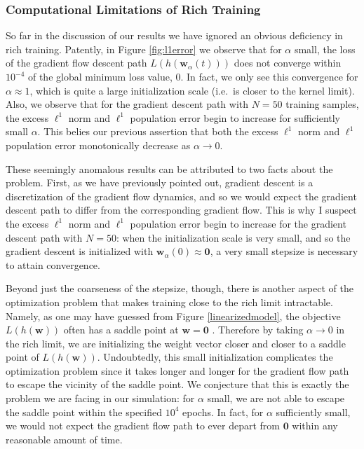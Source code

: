 \documentclass{article}
\begin{document}
\subsubsection{Computational Limitations of Rich Training}
So far in the discussion of our results we have ignored an obvious deficiency in rich training. Patently, in Figure \ref{fig:l1error} we observe that for $\alpha$ small, the loss of the gradient flow descent path $L(h(\boldsymbol{w}_{\alpha}(t)))$ does not converge within $10^{-4}$ of the global minimum loss value, $0$. In fact, we only see this convergence for $\alpha \approx 1$, which is quite a large initialization scale (i.e.~is closer to the kernel limit). Also, we observe that for the gradient descent path with $N=50$ training samples, the excess $\ell^1$ norm and $\ell^1$ population error begin to increase for sufficiently small $\alpha$. This belies our previous assertion that both the excess $\ell^1$ norm and $\ell^1$ population error monotonically decrease as $\alpha \rightarrow 0$.

These seemingly anomalous results can be attributed to two facts about the problem. First, as we have previously pointed out, gradient descent is a discretization of the gradient flow dynamics, and so we would expect the gradient descent path to differ from the corresponding gradient flow. This is why I suspect the excess $\ell^1$ norm and $\ell^1$ population error begin to increase for the gradient descent path with $N=50$: when the initialization scale is very small, and so the gradient descent is initialized with $\boldsymbol{w}_{\alpha}(0) \approx \boldsymbol{0}$, a very small stepsize is necessary to attain convergence. 

Beyond just the coarseness of the stepsize, though, there is another aspect of the optimization problem that makes training close to the rich limit intractable. Namely, as one may have guessed from Figure \ref{linearizedmodel}, the objective $L(h(\boldsymbol{w}))$ often has a saddle point at $\boldsymbol{w} = \boldsymbol{0}$ \cite{woodworth2020kernel}. Therefore by taking $\alpha \rightarrow 0$ in the rich limit, we are initializing the weight vector closer and closer to a saddle point of $L(h(\boldsymbol{w}))$. Undoubtedly, this small initialization complicates the optimization problem since it takes longer and longer for the gradient flow path to escape the vicinity of the saddle point. We conjecture that this is exactly the problem we are facing in our simulation: for $\alpha$ small, we are not able to escape the saddle point within the specified $10^4$ epochs. In fact, for $\alpha$ sufficiently small, we would not expect the gradient flow path to ever depart from $\boldsymbol{0}$ within any reasonable amount of time. 
\end{document}
